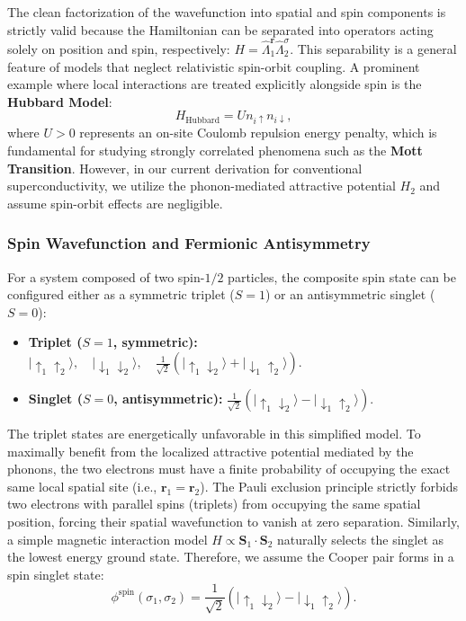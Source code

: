 \begin{remark}
    The clean factorization of the wavefunction into spatial and spin components is strictly valid because the Hamiltonian can be separated into operators acting solely on position and spin, respectively: \( H = \hat{\Lambda}_1^{\mathbf{r}} \hat{\Lambda}_2^{\sigma} \). This separability is a general feature of models that neglect relativistic spin-orbit coupling. A prominent example where local interactions are treated explicitly alongside spin is the \textbf{Hubbard Model}:
    \[
        H_{\text{Hubbard}} = U n_{i\uparrow} n_{i\downarrow},
    \]
    where \( U > 0 \) represents an on-site Coulomb repulsion energy penalty, which is fundamental for studying strongly correlated phenomena such as the \textbf{Mott Transition}. However, in our current derivation for conventional superconductivity, we utilize the phonon-mediated attractive potential \( H_2 \) and assume spin-orbit effects are negligible.
\end{remark}

\subsubsection{Spin Wavefunction and Fermionic Antisymmetry}

For a system composed of two spin-\( 1/2 \) particles, the composite spin state can be configured either as a symmetric triplet (\( S=1 \)) or an antisymmetric singlet (\( S=0 \)):
\begin{itemize}
    \item \textbf{Triplet (\( S=1 \), symmetric):} \( |\uparrow_1 \uparrow_2\rangle, \quad |\downarrow_1 \downarrow_2\rangle, \quad \frac{1}{\sqrt{2}}(|\uparrow_1 \downarrow_2\rangle + |\downarrow_1 \uparrow_2\rangle) \).
    \item \textbf{Singlet (\( S=0 \), antisymmetric):} \( \frac{1}{\sqrt{2}}(|\uparrow_1 \downarrow_2\rangle - |\downarrow_1 \uparrow_2\rangle) \).
\end{itemize}
The triplet states are energetically unfavorable in this simplified model. To maximally benefit from the localized attractive potential mediated by the phonons, the two electrons must have a finite probability of occupying the exact same local spatial site (i.e., \( \mathbf{r}_1 = \mathbf{r}_2 \)). The Pauli exclusion principle strictly forbids two electrons with parallel spins (triplets) from occupying the same spatial position, forcing their spatial wavefunction to vanish at zero separation. Similarly, a simple magnetic interaction model \( H \propto \mathbf{S}_1 \cdot \mathbf{S}_2 \) naturally selects the singlet as the lowest energy ground state. Therefore, we assume the Cooper pair forms in a spin singlet state:
\[
    \phi^{\text{spin}}(\sigma_1, \sigma_2) = \frac{1}{\sqrt{2}} \left( |\uparrow_1 \downarrow_2\rangle - |\downarrow_1 \uparrow_2\rangle \right).
\]

